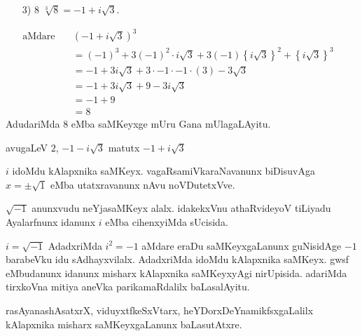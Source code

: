 \begin{itemize}
\item[{\rm 3)}] $8$  $\sqrt[3]{8} = -1 +i\sqrt{3}$.\\[-0.7cm]
\end{itemize}
\begin{align*}
\text{aMdare}\quad &(-1+i\sqrt{3})^3&\\
&= (-1)^3 + 3(-1)^2\cdot i\sqrt{3}+3(-1)\left\{i\sqrt{3}\right\}^2 + \left\{i\sqrt{3}\right\}^3\\
&= -1 + 3i\sqrt{3} +3\cdot -1\cdot -1 \cdot (3) - 3\sqrt{3}\\
&= -1+3i\sqrt{3}+9 -3i\sqrt{3}\\
&= -1+9\\
&= 8
\end{align*}
AdudariMda $8$ eMba saMKeyxge mUru Gana mUlagaLAyitu.

\smallskip
avugaLeV $2$, $-1-i\sqrt{3}$ \;matutx\; $-1+i\sqrt{3}$ 

$i$ idoMdu kAlapxnika saMKeyx. vagaRsamiVkaraNavanunx biDisuvAga $x =\pm \sqrt{1}$ eMba utatxravanunx nAvu noVDutetxVve.

\medskip
$\sqrt{-1}$ anunxvudu neYjasaMKeyx alalx. idakekxVnu athaRvideyoV tiLiyadu Ayalarfnunx idanunx $i$ eMba cihenxyiMda sUcisida.

\medskip
$i=\sqrt{-1}$ AdadxriMda $i^2=-1$ aMdare eraDu saMKeyxgaLanunx guNisidAge $-1$ barabeVku idu sAdhayxvilalx. AdadxriMda idoMdu kAlapxnika saMKeyx. gwsf eMbudanunx idanunx misharx kAlapxnika saMKeyxyAgi nirUpisida. adariMda tirxkoVna mitiya aneVka parikamaRdalilx baLasalAyitu.

rasAyanashAsatxrX, viduyxtfkeSxVtarx, heYDorxDeYnamikfsxgaLalilx kAlapxnika misharx saMKeyx\-gaLanunx baLasutAtxre.
